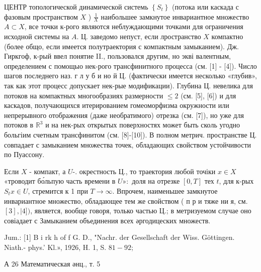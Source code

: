 \documentclass[10pt]{article}
\begin{document}
ЦЕНТР топологической динамической системь $\left\{S_{t}\right\}$ (потока или каскада с фазовым пространством $X$ ) $\frac{1}{X}$ наибольшее замкнутое инвариантное множество $A \subset X$, все точки к-рого являются неблуждающими точками для ограничения исходной системы на $A$. Ц. заведомо непуст, если лространство $X$ компактно (более общо, если имеется полутраектория с компактным замыканием). Дж. Гиркгоф, к-рый ввел понятие II., пользовался другим, но экві валентным, определением с помощыо нек-рого трансфинитного процесса (см. [1] - [4]). Число шагов последнего наз. г л у б и но й Ц. (фактически имеется несколько «глубив», так как этот процесс допускает нек-рые модификации). Глубина Ц. невелика для потоков на компактных многообразиях размерности $\leqslant 2$ (см. [5], [6]) и для каскадов, получающихся итерированием гомеоморфизма окружности или непрерывного отображения (даже необратимого) отрезка (см. [7]), но уже для потоков в $\mathbb{R}^{3}$ и на нек-рых открытых поверхностях может быть сколь угодно больгіим счетным трансфинитом (см. [8]-[10]). В полном метрич. пространстве Ц. совпадает с замыканием множества точек, обладающих свойством устойчивости по Пуассону.



Если $X$ - компакт, а $U$-. окрестность Ц., то траектория любой точіки $x \in X$ «троводит бо́льпую часть времени в $U »:$ доля на отрезке $[0, T]$ тех $t$, для к-рых $S_{t} x \in U$, стремится к 1 при $T \rightarrow \infty$. Впрочем, наименьшее замкнутое инвариантное множество, обладающее тем же свойством ( п р и тяже ни я, см. $[3], \mid 4])$, является, вообще говоря, только частью Ц.; в метризуемом случае оно совіадает с Замыканием объединения всех әргодицеских множеств.



Jum.: [1] B i rk h of f G. D., "Nachr. der Gesellschaft der Wiss. Göttingen. Niath.- phys.' Kl.», 1926, H. 1, S. $81-92$;



А 26 Математическая әнц., т. 5
\end{document}
